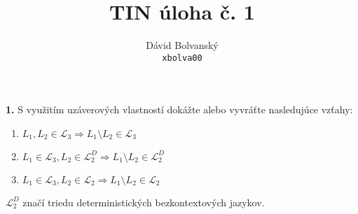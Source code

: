 \documentclass[12pt]{article}
\newcommand{\task}[2]{\par \noindent \textbf{{#1}.} \hspace{3pt} #2 \vspace{10pt}}
\begin{document}
 
\title{TIN úloha č. 1}
\author{Dávid Bolvanský \\ \small\texttt{xbolva00}}
\date{}
\maketitle

\task{1}{
S využitím uzáverových vlastností dokážte alebo vyvráťte nasledujúce vzťahy:
	\begin{enumerate}[label=(\alph*)]
		\item{$L_1, L_2 \in \mathcal{L}_3 \Rightarrow L_1 \setminus L_2 \in \mathcal{L}_3$}
		\item{$L_1 \in \mathcal{L}_3, L_2 \in \mathcal{L}_2^D \Rightarrow L_1 \setminus L_2 \in \mathcal{L}_2^D$}
		\item{$L_1 \in \mathcal{L}_3, L_2 \in \mathcal{L}_2 \Rightarrow L_1 \setminus L_2 \in \mathcal{L}_2$}
	\end{enumerate}
	$\mathcal{L}_2^D$ značí triedu deterministických bezkontextových jazykov.
}
\end{document}
